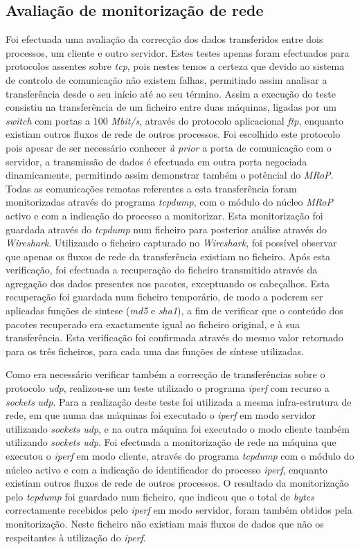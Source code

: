 \subsection{Avaliação de monitorização de rede}

Foi efectuada uma avaliação da correcção dos dados transferidos entre dois processos, um cliente e outro servidor.
Estes testes apenas foram efectuados para protocolos assentes sobre \textit{tcp}, pois nestes temos a certeza que devido ao sistema de controlo de comunicação não existem falhas, permitindo assim analisar a transferência desde o seu início até ao seu término.
Assim a execução do teste consistiu na transferência de um ficheiro entre duas máquinas, ligadas por um \textit{switch} com portas a 100 \textit{Mbit/s}, através do protocolo aplicacional \textit{ftp}, enquanto existiam outros fluxos de rede de outros processos.
Foi escolhido este protocolo pois apesar de ser necessário conhecer \textit{à prior} a porta de comunicação com o servidor, a transmissão de dados é efectuada em outra porta negociada dinamicamente, permitindo assim demonstrar também o potêncial do \textit{MRoP}.
Todas as comunicações remotas referentes a esta transferência foram monitorizadas através do programa \textit{tcpdump}, com o módulo do núcleo \textit{MRoP} activo e com a indicação do processo a monitorizar.
Esta monitorização foi guardada através do \textit{tcpdump} num ficheiro para posterior análise através do \textit{Wireshark}.
Utilizando o ficheiro capturado no \textit{Wireshark}, foi possível observar que apenas os fluxos de rede da transferência existiam no ficheiro.
Após esta verificação, foi efectuada a recuperação do ficheiro transmitido através da agregação dos dados presentes nos pacotes, exceptuando os cabeçalhos.
Esta recuperação foi guardada num ficheiro temporário, de modo a poderem ser aplicadas funções de sintese (\textit{md5} e \textit{sha1}), a fim de verificar que o conteúdo dos pacotes recuperado era exactamente igual ao ficheiro original, e à sua transferência.
Esta verificação foi confirmada através do mesmo valor retornado para os três ficheiros, para cada uma das funções de síntese utilizadas.

Como era necessário verificar também a correcção de transferências sobre o protocolo \textit{udp}, realizou-se um teste utilizado o programa \textit{iperf} com recurso a \textit{sockets} \textit{udp}.
Para a realização deste teste foi utilizada a mesma infra-estrutura de rede, em que numa das máquinas foi executado o \textit{iperf} em modo servidor utilizando \textit{sockets udp}, e na outra máquina foi executado o modo cliente também utilizando \textit{sockets udp}.
Foi efectuada a monitorização de rede na máquina que executou o \textit{iperf} em modo cliente, através do programa \textit{tcpdump} com o módulo do núcleo activo e com a indicação do identificador do processo \textit{iperf}, enquanto existiam outros fluxos de rede de outros processos.
O resultado da monitorização pelo \textit{tcpdump} foi guardado num ficheiro, que indicou que o total de \textit{bytes} correctamente recebidos pelo \textit{iperf} em modo servidor, foram também obtidos pela monitorização.
Neste ficheiro não existiam mais fluxos de dados que não os respeitantes à utilização do \textit{iperf}.

